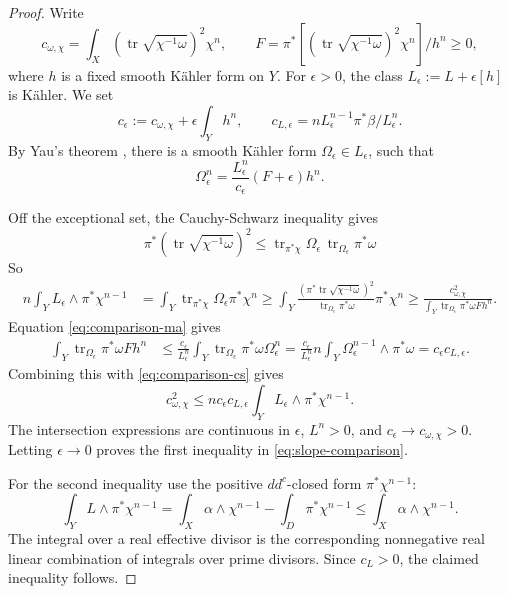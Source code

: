 \documentclass[reqno]{amsart}
\numberwithin{equation}{section}
\theoremstyle{definition}
\DeclareMathOperator{\tr}{tr}
\newcommand{\coc}{c_{\omega,\chi}}
\begin{document}
\begin{proof}

Write \[
\coc=\int_X (\tr\sqrt{\chi^{-1}\omega})^2\chi^n, \qquad   F=\pi^*[(\tr\sqrt{\chi^{-1}\omega})^2\chi^n]/h^n\geq 0,\] where $h$ is a fixed smooth K\"ahler form on $Y$. For $\epsilon>0$, the class $L_\epsilon:=L+\epsilon[h]$ is K\"ahler. We set \[
c_\epsilon:=\coc+\epsilon\int_Yh^n, \qquad c_{L,\epsilon}=nL_\epsilon^{n-1}\pi^*\beta/L_{\epsilon}^n.
\]
By Yau's theorem \cite{Y78}, there is a smooth K\"ahler form $\Omega_\epsilon\in L_\epsilon$, such that
\begin{equation}\label{eq:comparison-ma}
\Omega_\epsilon^n
=\frac{L_\epsilon^n}{c_\epsilon}(F+\epsilon)h^n.
\end{equation}

Off the exceptional set, the Cauchy-Schwarz inequality gives\[
\pi^*(\tr\sqrt{\chi^{-1}\omega})^2\leq \tr_{\pi^*\chi}\Omega_\epsilon\,\tr_{\Omega_\epsilon}\pi^*\omega
\]
So 
\begin{equation}\label{eq:comparison-cs}
\begin{aligned}
n\int_YL_\epsilon\wedge\pi^*\chi^{n-1}
&=\int_Y\tr_{\pi^*\chi}\Omega_\epsilon \pi^*\chi^n\geq\int_Y\frac{(\pi^*\tr\sqrt{\chi^{-1}\omega})^2}{\tr_{\Omega_\epsilon}\pi^*\omega}\pi^*\chi^n\geq\frac{\coc^2}{\displaystyle\int_Y\tr_{\Omega_\epsilon}\pi^*\omega Fh^n}.
\end{aligned}
\end{equation}
 Equation \eqref{eq:comparison-ma} gives
\[
\begin{aligned}
\int_Y\tr_{\Omega_\epsilon}\pi^*\omega Fh^n
&\leq\frac{c_\epsilon}{L_\epsilon^n}
       \int_Y\tr_{\Omega_\epsilon}\pi^*\omega\Omega_\epsilon^n=\frac{c_\epsilon}{L_\epsilon^n}
       n\int_Y\Omega_\epsilon^{n-1}\wedge \pi^*\omega
=c_\epsilon c_{L,\epsilon}.
\end{aligned}
\]
Combining this with \eqref{eq:comparison-cs} gives
\[
\coc^2\leq nc_\epsilon c_{L,\epsilon}
\int_YL_\epsilon\wedge\pi^*\chi^{n-1}.
\]
The intersection expressions are continuous in $\epsilon$, $L^n>0$, and $c_\epsilon\to \coc>0$. Letting $\epsilon\to0$ proves the first inequality in \eqref{eq:slope-comparison}.

For the second inequality use the positive $dd^c$-closed form $\pi^*\chi^{n-1}$:
\[
\int_YL\wedge\pi^*\chi^{n-1}
=\int_X\alpha\wedge\chi^{n-1}
-\int_D\pi^*\chi^{n-1}
\leq\int_X\alpha\wedge\chi^{n-1}.
\]
The integral over a real effective divisor is the corresponding nonnegative real linear combination of integrals over prime divisors. Since $c_L>0$, the claimed inequality follows.

\end{proof}
\end{document}
